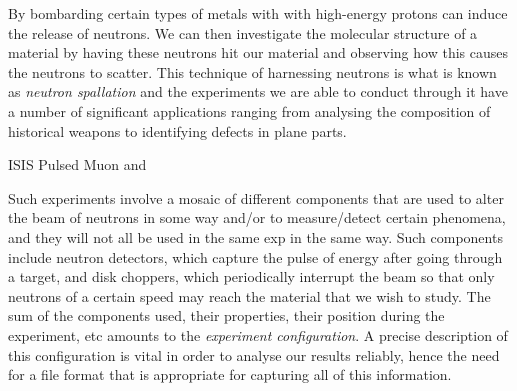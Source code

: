 By bombarding certain types of metals with with high-energy protons can induce the release of neutrons. We can then investigate the molecular structure of a material by having these neutrons hit our material and observing how this causes the neutrons to scatter. This technique of harnessing neutrons is what is known as \textit{neutron spallation} and the experiments we are able to conduct through it have a number of significant applications ranging from analysing the composition of historical weapons to identifying defects in plane parts.

ISIS Pulsed Muon and 

Such experiments involve a mosaic of different components that are used to alter the beam of neutrons in some way and/or to measure/detect certain phenomena, and they will not all be used in the same exp in the same way. Such components include neutron detectors, which capture the pulse of energy after going through a target, and disk choppers, which periodically interrupt the beam so that only neutrons of a certain speed may reach the material that we wish to study. The sum of the components used, their properties, their position during the experiment, etc amounts to the \textit{experiment configuration}. A precise description of this configuration is vital in order to analyse our results reliably, hence the need for a file format that is appropriate for capturing all of this information.
